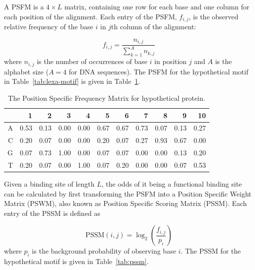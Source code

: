 A PSFM is a $4 \times L$ matrix, containing one row for each base and one
column for each position of the alignment. Each entry of the PSFM, $f_{i, j}$,
is the observed relative frequency of the base $i$ in $j$th column of the
alignment:

\begin{equation}
  \label{eq:psfm}
  f_{i, j} = \frac{n_{i, j}}{\displaystyle\sum_{k=1}^A n_{k, j}}
\end{equation}
where $n_{i, j}$ is the number of occurrences of base $i$ in position $j$ and
$A$ is the alphabet size ($A=4$ for DNA sequences). The PSFM for the
hypothetical motif in Table~\ref{tab:lexa-motif} is given in
Table~\ref{tab:psfm}.

\begin{table}
  \centering
  \caption{The Position Specific Frequency Matrix for hypothetical protein.}
\label{tab:psfm}
  \begin{tabular}{|r|r|r|r|r|r|r|r|r|r|r|}
\hline
  &    1 &   2 &    3 &    4 &    5 &    6 &    7 &    8 &    9 & 10\\
\hline
A & 0.53 & 0.13 & 0.00 & 0.00 & 0.67 & 0.67 & 0.73 & 0.07 & 0.13 & 0.27 \\
\hline
C & 0.20 & 0.07 & 0.00 & 0.00 & 0.20 & 0.07 & 0.27 & 0.93 & 0.67 & 0.00 \\
\hline
G & 0.07 & 0.73 & 1.00 & 0.00 & 0.07 & 0.07 & 0.00 & 0.00 & 0.13 & 0.20 \\
\hline
T & 0.20 & 0.07 & 0.00 & 1.00 & 0.07 & 0.20 & 0.00 & 0.00 & 0.07 & 0.53 \\
\hline
  \end{tabular}
\end{table}

Given a binding site of length $L$, the odds of it being a functional binding
site can be calculated by first transforming the PSFM into a Position Specific
Weight Matrix (PSWM), also known as Position Specific Scoring Matrix
(PSSM). Each entry of the PSSM is defined as

\begin{equation}
  \label{eq:pssm}
  \mathrm{PSSM}(i, j) = \log_2\left(\frac{f_{i, j}}{p_i}\right)
\end{equation}
where $p_i$ is the background probability of observing base $i$. The PSSM for
the hypothetical motif is given in Table~\ref{tab:pssm}.

